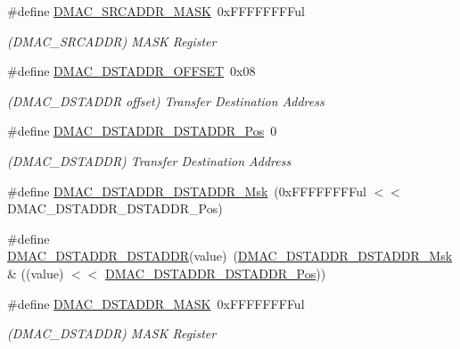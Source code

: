 \begin{DoxyCompactItemize}
\item 
\#define \mbox{\hyperlink{group___s_a_m_d21___d_m_a_c_ga9ac8c4e53c5e259f55f800f4825d969c}{D\+M\+A\+C\+\_\+\+S\+R\+C\+A\+D\+D\+R\+\_\+\+M\+A\+SK}}~0x\+F\+F\+F\+F\+F\+F\+F\+Ful
\begin{DoxyCompactList}\small\item\em (D\+M\+A\+C\+\_\+\+S\+R\+C\+A\+D\+DR) M\+A\+SK Register \end{DoxyCompactList}\item 
\#define \mbox{\hyperlink{group___s_a_m_d21___d_m_a_c_ga2a50508d7f408649cc4548f287d03997}{D\+M\+A\+C\+\_\+\+D\+S\+T\+A\+D\+D\+R\+\_\+\+O\+F\+F\+S\+ET}}~0x08
\begin{DoxyCompactList}\small\item\em (D\+M\+A\+C\+\_\+\+D\+S\+T\+A\+D\+DR offset) Transfer Destination Address \end{DoxyCompactList}\item 
\#define \mbox{\hyperlink{group___s_a_m_d21___d_m_a_c_ga987e326ffd8f63aea885b7f6ed74cb17}{D\+M\+A\+C\+\_\+\+D\+S\+T\+A\+D\+D\+R\+\_\+\+D\+S\+T\+A\+D\+D\+R\+\_\+\+Pos}}~0
\begin{DoxyCompactList}\small\item\em (D\+M\+A\+C\+\_\+\+D\+S\+T\+A\+D\+DR) Transfer Destination Address \end{DoxyCompactList}\item 
\#define \mbox{\hyperlink{group___s_a_m_d21___d_m_a_c_gacc265201fa00cb96810a0c817039bc15}{D\+M\+A\+C\+\_\+\+D\+S\+T\+A\+D\+D\+R\+\_\+\+D\+S\+T\+A\+D\+D\+R\+\_\+\+Msk}}~(0x\+F\+F\+F\+F\+F\+F\+F\+Ful $<$$<$ D\+M\+A\+C\+\_\+\+D\+S\+T\+A\+D\+D\+R\+\_\+\+D\+S\+T\+A\+D\+D\+R\+\_\+\+Pos)
\item 
\#define \mbox{\hyperlink{group___s_a_m_d21___d_m_a_c_ga48e696dcafbf63ae50fabb9a8417e805}{D\+M\+A\+C\+\_\+\+D\+S\+T\+A\+D\+D\+R\+\_\+\+D\+S\+T\+A\+D\+DR}}(value)~(\mbox{\hyperlink{group___s_a_m_d21___d_m_a_c_gacc265201fa00cb96810a0c817039bc15}{D\+M\+A\+C\+\_\+\+D\+S\+T\+A\+D\+D\+R\+\_\+\+D\+S\+T\+A\+D\+D\+R\+\_\+\+Msk}} \& ((value) $<$$<$ \mbox{\hyperlink{group___s_a_m_d21___d_m_a_c_ga987e326ffd8f63aea885b7f6ed74cb17}{D\+M\+A\+C\+\_\+\+D\+S\+T\+A\+D\+D\+R\+\_\+\+D\+S\+T\+A\+D\+D\+R\+\_\+\+Pos}}))
\item 
\#define \mbox{\hyperlink{group___s_a_m_d21___d_m_a_c_ga774a0eed386076ad7e52c56d11bcb467}{D\+M\+A\+C\+\_\+\+D\+S\+T\+A\+D\+D\+R\+\_\+\+M\+A\+SK}}~0x\+F\+F\+F\+F\+F\+F\+F\+Ful
\begin{DoxyCompactList}\small\item\em (D\+M\+A\+C\+\_\+\+D\+S\+T\+A\+D\+DR) M\+A\+SK Register \end{DoxyCompactList}\item 

\end{DoxyCompactItemize}
